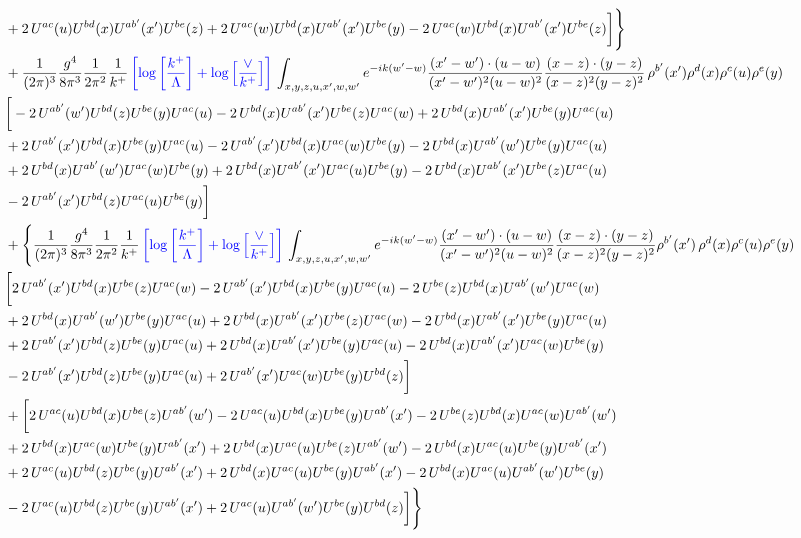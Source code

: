 \documentclass[aps,prd,amsmath,amssymb,nofootinbib]{revtex4-2}
\numberwithin{equation}{section}
\begin{document}
\begin{align}
    & +2\, U^{ac}(u)U^{bd}(x)U^{ab'}(x')U^{be}(z) + 2\,U^{ac}(w)U^{bd}(x)U^{ab'}(x')U^{be}(y)- 2\,U^{ac}(w)U^{bd}(x)U^{ab'}(x')U^{be}(z)\bigg]\Bigg\}\notag \\ & + \frac{1}{(2\pi)^{3}}\frac{g^{4}}{8\pi^{3}}\frac{1}{2\pi^{2}} \frac{1}{k^{+}}\,{\color{blue}\left[\log{\left[\frac{k^{+}}{\Lambda}\right]}+\log{\left[\frac{\vee}{k^{+}}\right]}\right]}\,\int_{x,y,z,u,x^{\prime},w,w^{\prime}}e^{-ik(w^{\prime}-w)}\frac{(x^{\prime}-w^{\prime})\cdot (u-w)}{(x^{\prime}-w^{\prime})^{2} (u-w)^{2}} \frac{(x-z)\cdot (y-z)}{(x-z)^{2}(y-z)^{2}}\,\rho^{b'}(x^{\prime})\rho^{d}(x)\rho^{c}(u)\rho^{e}(y)\notag \\ & \bigg[-2\,U^{ab'}(w')U^{bd}(z)U^{be}(y)U^{ac}(u) - 2\,U^{bd}(x)U^{ab'}(x^{\prime})U^{be}(z)U^{ac}(w)+ 2\,U^{bd}(x)U^{ab'}(x')U^{be}(y)U^{ac}(u)\notag \\ & + 2\, U^{ab'}(x')U^{bd}(x)U^{be}(y)U^{ac}(u) - 2\,U^{ab'}(x')U^{bd}(x)U^{ac}(w)U^{be}(y) - 2\,U^{bd}(x)U^{ab'}(w')U^{be}(y)U^{ac}(u)\notag \\ &  + 2\, U^{bd}(x)U^{ab'}(w')U^{ac}(w)U^{be}(y) +2\, U^{bd}(x)U^{ab'}(x')U^{ac}(u)U^{be}(y) - 2\,U^{bd}(x)U^{ab'}(x')U^{be}(z)U^{ac}(u)\notag \\ &  - 2\, U^{ab'}(x')U^{bd}(z)U^{ac}(u)U^{be}(y)\bigg]\notag \\ & + \Bigg\{\frac{1}{(2\pi)^{3}}\frac{g^{4}}{8\pi^{3}}\frac{1}{2\pi^{2}} \frac{1}{k^{+}}\,{\color{blue}\left[\log{\left[\frac{k^{+}}{\Lambda}\right]}+\log{\left[\frac{\vee}{k^{+}}\right]}\right]}\,\int_{x,y,z,u,x^{\prime},w,w^{\prime}}e^{-ik(w^{\prime}-w)}\frac{(x^{\prime}-w^{\prime})\cdot (u-w)}{(x^{\prime}-w^{\prime})^{2} (u-w)^{2}} \frac{(x-z)\cdot (y-z)}{(x-z)^{2}(y-z)^{2}}\rho^{b'}(x^{\prime})\,\rho^{d}(x)\rho^{c}(u)\rho^{e}(y)\notag \\ & \bigg[2\,U^{ab'}(x')U^{bd}(x)U^{be}(z)U^{ac}(w)-2\,U^{ab'}(x')U^{bd}(x)U^{be}(y)U^{ac}(u)-2\,U^{be}(z)U^{bd}(x)U^{ab'}(w')U^{ac}(w)\notag \\ &+2\,U^{bd}(x)U^{ab'}(w')U^{be}(y)U^{ac}(u) +2\,U^{bd}(x)U^{ab'}(x')U^{be}(z)U^{ac}(w) - 2\,U^{bd}(x)U^{ab'}(x')U^{be}(y)U^{ac}(u)\notag \\ & +2\,U^{ab'}(x')U^{bd}(z)U^{be}(y)U^{ac}(u)+2\,U^{bd}(x)U^{ab'}(x')U^{be}(y)U^{ac}(u) -2\, U^{bd}(x)U^{ab'}(x')U^{ac}(w)U^{be}(y)\notag \\ & -2\,  U^{ab'}(x')U^{bd}(z)U^{be}(y)U^{ac}(u) + 2\, U^{ab'}(x')U^{ac}(w)U^{be}(y)U^{bd}(z)\bigg]\notag \\ & +\bigg[2\,U^{ac}(u)U^{bd}(x)U^{be}(z)U^{ab'}(w') -2\,U^{ac}(u)U^{bd}(x)U^{be}(y)U^{ab'}(x')-2\,U^{be}(z)U^{bd}(x)U^{ac}(w)U^{ab'}(w')\notag \\ & +2\,U^{bd}(x)U^{ac}(w)U^{be}(y)U^{ab'}(x') +2\,U^{bd}(x)U^{ac}(u)U^{be}(z)U^{ab'}(w') -2\,U^{bd}(x)U^{ac}(u)U^{be}(y)U^{ab'}(x')\notag \\  & + 2\,U^{ac}(u)U^{bd}(z)U^{be}(y)U^{ab'}(x')+ 2\,U^{bd}(x)U^{ac}(u)U^{be}(y)U^{ab'}(x') -2\, U^{bd}(x)U^{ac}(u)U^{ab'}(w')U^{be}(y)\notag \\ & 
     -2\, U^{ac}(u)U^{bd}(z)U^{be}(y)U^{ab'}(x')+2\, U^{ac}(u)U^{ab'}(w')U^{be}(y)U^{bd}(z)\bigg]\Bigg\}
\end{align}
\end{document}
